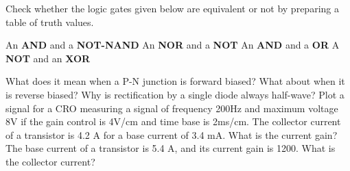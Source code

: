 \documentclass[12pt,addpoints]{exam}
\begin{document}
\begin{questions}
		\question Check whether the logic gates given below are equivalent or not by preparing a table of truth values.
		\begin{choices}
			\choice An \textbf{AND} and a \textbf{NOT-NAND}\vspace{1in}
			\choice An \textbf{NOR} and a \textbf{NOT}\vspace{1in}
			\choice An \textbf{AND} and a \textbf{OR}\vspace{1in}
			\choice A \textbf{NOT} and an \textbf{XOR}\vspace{1in}
		\end{choices}
		\question What does it mean when a P-N junction is forward biased? What about when it is reverse biased?\vspace{1.5in}
		\question Why is rectification by a single diode always half-wave?\vspace{2.5in}
		\question Plot a signal for a CRO measuring a signal of frequency 200Hz and maximum voltage 8V if the gain control is 4V/cm and time base is 2ms/cm.\vspace{1.5in}
		\question The collector current of a transistor is 4.2 A for a base current of 3.4 mA. What is the current gain?\vspace{1.5in}
		\question The base current of a transistor is 5.4 A, and its current gain is 1200. What is the collector current?\vspace{1.5in}\newpage

\end{questions}
\end{document}
